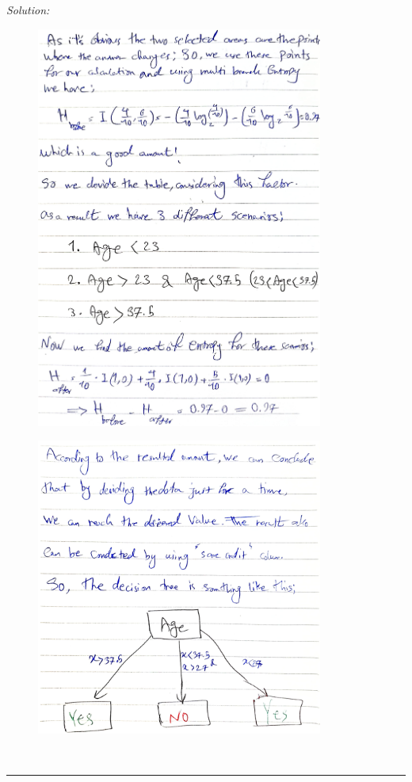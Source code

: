 \documentclass[a4paper, 11pt]{article}
\newenvironment{solution}
    {\textit{Solution:}}
    {}
\begin{document}
{\begin{solution}
\begin{figure}[h!]
		\includegraphics[width=0.84\textwidth]{2.jpg}
	\end{figure}
	\pagebreak
		\begin{figure}[h!]
		\centering
		\includegraphics[width=0.84\textwidth]{3.jpg}
	\end{figure}
\end{solution}
\\\noindent\rule{7in}{2.8pt}
\pagebreak
\end{document}
